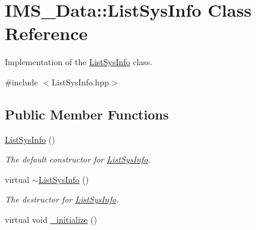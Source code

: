 \hypertarget{classIMS__Data_1_1ListSysInfo}{
\section{IMS\_\-Data::ListSysInfo Class Reference}
\label{classIMS__Data_1_1ListSysInfo}
}


Implementation of the \hyperlink{classIMS__Data_1_1ListSysInfo}{ListSysInfo} class.  




{\ttfamily \#include $<$ListSysInfo.hpp$>$}

\subsection*{Public Member Functions}
\begin{DoxyCompactItemize}
\item 
\hypertarget{classIMS__Data_1_1ListSysInfo_a1de55cb91e9c69ca0dd7955b33c75e19}{
\hyperlink{classIMS__Data_1_1ListSysInfo_a1de55cb91e9c69ca0dd7955b33c75e19}{ListSysInfo} ()}
\label{classIMS__Data_1_1ListSysInfo_a1de55cb91e9c69ca0dd7955b33c75e19}

\begin{DoxyCompactList}\small\item\em The default constructor for \hyperlink{classIMS__Data_1_1ListSysInfo}{ListSysInfo}. \item\end{DoxyCompactList}\item 
\hypertarget{classIMS__Data_1_1ListSysInfo_a8ceb317d772f218c9c3385f5bcd38a77}{
virtual \hyperlink{classIMS__Data_1_1ListSysInfo_a8ceb317d772f218c9c3385f5bcd38a77}{$\sim$ListSysInfo} ()}
\label{classIMS__Data_1_1ListSysInfo_a8ceb317d772f218c9c3385f5bcd38a77}

\begin{DoxyCompactList}\small\item\em The destructor for \hyperlink{classIMS__Data_1_1ListSysInfo}{ListSysInfo}. \item\end{DoxyCompactList}\item 
\hypertarget{classIMS__Data_1_1ListSysInfo_a910e897b8cee71a048b395fbedb9c384}{
virtual void \hyperlink{classIMS__Data_1_1ListSysInfo_a910e897b8cee71a048b395fbedb9c384}{\_\-initialize} ()}
\label{classIMS__Data_1_1ListSysInfo_a910e897b8cee71a048b395fbedb9c384}


\end{DoxyCompactItemize}
